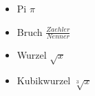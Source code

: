 \documentclass{article}
\begin{document}
  \begin{itemize}
    \item Pi $\pi$
    \item Bruch $\frac{Zaehler}{Nenner}$
    \item Wurzel $\sqrt{x}$
    \item Kubikwurzel $\sqrt[3]{x}$
  \end{itemize}
\end{document}
